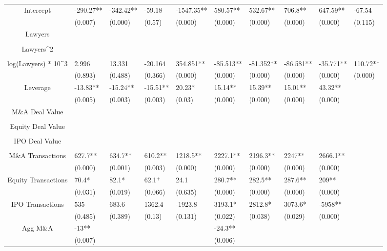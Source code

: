 \documentclass{article}
\begin{document}
\begin{table}[H]
\begin{tabular}{|clllllllll|}
Intercept & -290.27** & -342.42** & -59.18 & -1547.35** & 580.57** & 532.67** & 706.8** & 647.59** & -67.54 \\
   & (0.007) & (0.000) & (0.57) & (0.000) & (0.000) & (0.000) & (0.000) & (0.000) & (0.115) \\
  Lawyers &  &  &  &  &  &  &  &  &  \\
   &  &  &  &  &  &  &  &  &  \\
  Lawyers^2 &  &  &  &  &  &  &  &  &  \\
   &  &  &  &  &  &  &  &  &  \\
  log(Lawyers) * 10^3 & 2.996 & 13.331 & -20.164 & 354.851** & -85.513** & -81.352** & -86.581** & -35.771** & 110.72** \\
   & (0.893) & (0.488) & (0.366) & (0.000) & (0.000) & (0.000) & (0.000) & (0.000) & (0.000) \\
  Leverage & -13.83** & -15.24** & -15.51** & 20.23* & 15.14** & 15.39** & 15.01** & 43.32** &  \\
   & (0.005) & (0.003) & (0.003) & (0.03) & (0.000) & (0.000) & (0.000) & (0.000) &  \\
  M\&A Deal Value &  &  &  &  &  &  &  &  &  \\
   &  &  &  &  &  &  &  &  &  \\
  Equity Deal Value &  &  &  &  &  &  &  &  &  \\
   &  &  &  &  &  &  &  &  &  \\
  IPO Deal Value &  &  &  &  &  &  &  &  &  \\
   &  &  &  &  &  &  &  &  &  \\
  M\&A Transactions & 627.7** & 634.7** & 610.2** & 1218.5** & 2227.1** & 2196.3** & 2247** & 2666.1** &  \\
   & (0.000) & (0.001) & (0.003) & (0.000) & (0.000) & (0.000) & (0.000) & (0.000) &  \\
  Equity Transactions & 70.4* & 82.1* & 62.1$^{+}$ & 24.1 & 280.7** & 282.5** & 287.6** & 209** &  \\
   & (0.031) & (0.019) & (0.066) & (0.635) & (0.000) & (0.000) & (0.000) & (0.000) &  \\
  IPO Transactions & 535 & 683.6 & 1362.4 & -1923.8 & 3193.1* & 2812.8* & 3073.6* & -5958** &  \\
   & (0.485) & (0.389) & (0.13) & (0.131) & (0.022) & (0.038) & (0.029) & (0.000) &  \\
  Agg M\&A & -13** &  &  &  & -24.3** &  &  &  &  \\
   & (0.007) &  &  &  & (0.006) &  &  &  &  \\

\end{tabular}
\end{table}
\end{document}
